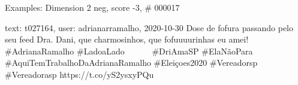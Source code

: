 \begin{frame}{Examples: Dimension 2 neg, score -3, \# 000017}
\footnotesize
\begin{alertblock}{text: t027164, user: adrianarramalho, 2020-10-30}
Dose de fofura passando pelo seu feed  
\textbf{} Dra. Dani, que charmosinhos, que 
fofuuuurinhas  eu amei! \#AdrianaRamalho 
\#LadoaLado⠀⠀⠀⠀ \#DriAmaSP \#ElaNãoPara⠀⠀⠀ \#AquiTemTrabalhoDaAdrianaRamalho 
\#Eleiçoes2020 \#Vereadorsp \#Vereadorasp https://t.co/yS2ysxyPQu 
\end{alertblock}
\end{frame}
